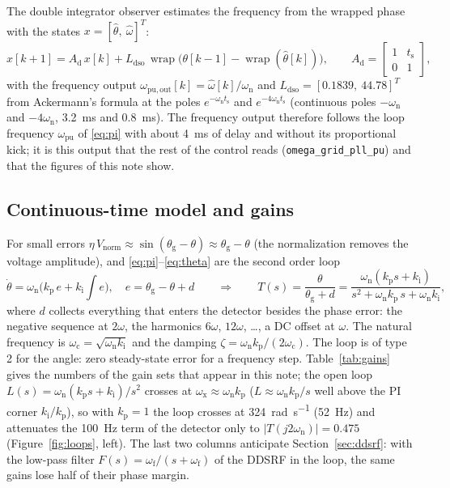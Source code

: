 \documentclass[11pt,a4paper]{scrartcl}
\newcommand{\ped}[1]{_{\mathrm{#1}}}
\newcommand{\code}[1]{\texttt{#1}}
\newcommand{\wrapop}{\operatorname{wrap}}
\begin{document}
\begin{onehalfspace}
The double integrator observer estimates the frequency from the wrapped phase with the states $x = [\hat\theta,\ \hat\omega]^T$:
\begin{equation}
	x[k+1] = A\ped{d}\, x[k] + L\ped{dso}\, \wrapop\big(\theta[k-1] - \wrapop(\hat\theta[k])\big), \qquad A\ped{d} = \begin{bmatrix} 1 & t\ped{s} \\ 0 & 1 \end{bmatrix},
\end{equation}
with the frequency output $\omega\ped{pu,out}[k] = \hat\omega[k]/\omega\ped{n}$ and $L\ped{dso} = [0.1839,\ 44.78]^T$ from Ackermann's formula at the poles $e^{-\omega\ped{n} t\ped{s}}$ and $e^{-4\omega\ped{n} t\ped{s}}$ (continuous poles $-\omega\ped{n}$ and $-4\omega\ped{n}$, \SI{3.2}{\milli\second} and \SI{0.8}{\milli\second}). The frequency output therefore follows the loop frequency $\omega\ped{pu}$ of \eqref{eq:pi} with about \SI{4}{\milli\second} of delay and without its proportional kick; it is this output that the rest of the control reads (\code{omega\_grid\_pll\_pu}) and that the figures of this note show.

\subsection{Continuous-time model and gains}
\label{sec:loopmodel}

For small errors $\eta\, V\ped{norm} \approx \sin(\theta\ped{g} - \theta) \approx \theta\ped{g} - \theta$ (the normalization removes the voltage amplitude), and \eqref{eq:pi}--\eqref{eq:theta} are the second order loop
\begin{equation}
	\dot\theta = \omega\ped{n}\Big(k\ped{p}\, e + k\ped{i} \int e\Big), \quad e = \theta\ped{g} - \theta + d
	\qquad\Longrightarrow\qquad
	T(s) = \frac{\theta}{\theta\ped{g} + d} = \frac{\omega\ped{n}(k\ped{p} s + k\ped{i})}{s^2 + \omega\ped{n} k\ped{p}\, s + \omega\ped{n} k\ped{i}},
	\label{eq:T}
\end{equation}
where $d$ collects everything that enters the detector besides the phase error: the negative sequence at $2\omega$, the harmonics $6\omega$, $12\omega$, \ldots, a DC offset at $\omega$. The natural frequency is $\omega\ped{c} = \sqrt{\omega\ped{n} k\ped{i}}$ and the damping $\zeta = \omega\ped{n} k\ped{p} / (2\omega\ped{c})$. The loop is of type 2 for the angle: zero steady-state error for a frequency step. Table~\ref{tab:gains} gives the numbers of the gain sets that appear in this note; the open loop $L(s) = \omega\ped{n}(k\ped{p} s + k\ped{i})/s^2$ crosses at $\omega\ped{x} \approx \omega\ped{n} k\ped{p}$ ($L \approx \omega\ped{n} k\ped{p}/s$ well above the PI corner $k\ped{i}/k\ped{p}$), so with $k\ped{p} = 1$ the loop crosses at \SI{324}{\radian\per\second} (\SI{52}{\hertz}) and attenuates the \SI{100}{\hertz} term of the detector only to $|T(j2\omega\ped{n})| = 0.475$ (Figure~\ref{fig:loops}, left). The last two columns anticipate Section~\ref{sec:ddsrf}: with the low-pass filter $F(s) = \omega\ped{f}/(s+\omega\ped{f})$ of the DDSRF in the loop, the same gains lose half of their phase margin.


\end{onehalfspace}
\end{document}

